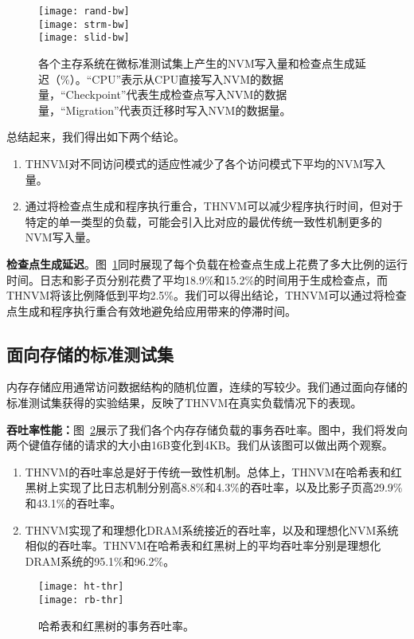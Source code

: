 \begin{figure}[!ht]
\centering
\texttt{[image: rand-bw]}\\
\texttt{[image: strm-bw]}\\
\texttt{[image: slid-bw]}\\
\caption{各个主存系统在微标准测试集上产生的NVM写入量和检查点生成延迟（\%）。``CPU''表示从CPU直接写入NVM的数据量，``Checkpoint''代表生成检查点写入NVM的数据量，``Migration''代表页迁移时写入NVM的数据量。}
\label{fig:micro-bw}
\end{figure}

总结起来，我们得出如下两个结论。
\begin{enumerate}
\item THNVM对不同访问模式的适应性减少了各个访问模式下平均的NVM写入量。 
\item 通过将检查点生成和程序执行重合，THNVM可以减少程序执行时间，但对于特定的单一类型的负载，可能会引入比对应的最优传统一致性机制更多的NVM写入量。
\end{enumerate}

\textbf{检查点生成延迟}。图~\ref{fig:micro-bw}同时展现了每个负载在检查点生成上花费了多大比例的运行时间。日志和影子页分别花费了平均18.9\%和15.2\%的时间用于生成检查点，而THNVM将该比例降低到平均2.5\%。我们可以得出结论，THNVM可以通过将检查点生成和程序执行重合有效地避免给应用带来的停滞时间。 

\subsection{面向存储的标准测试集}

内存存储应用通常访问数据结构的随机位置，连续的写较少。我们通过面向存储的标准测试集获得的实验结果，反映了THNVM在真实负载情况下的表现。

\textbf{吞吐率性能：}图~\ref{fig:rb-thr}展示了我们各个内存存储负载的事务吞吐率。图中，我们将发向两个键值存储的请求的大小由16B变化到4KB。我们从该图可以做出两个观察。
\begin{enumerate}
\item THNVM的吞吐率总是好于传统一致性机制。总体上，THNVM在哈希表和红黑树上实现了比日志机制分别高8.8\%和4.3\%的吞吐率，以及比影子页高29.9\%和43.1\%的吞吐率。
\item THNVM实现了和理想化DRAM系统接近的吞吐率，以及和理想化NVM系统相似的吞吐率。THNVM在哈希表和红黑树上的平均吞吐率分别是理想化DRAM系统的95.1\%和96.2\%。
\end{enumerate}

\begin{figure}[!ht]
  \centering
  \texttt{[image: ht-thr]}\\
  \texttt{[image: rb-thr]}\\
  \caption{哈希表和红黑树的事务吞吐率。}
  \label{fig:rb-thr}
\end{figure}


